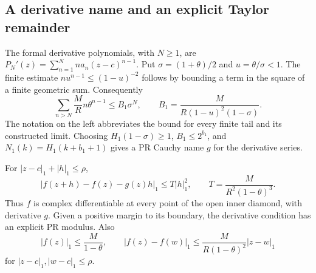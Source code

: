 \subsection{A derivative name and an explicit Taylor remainder}

The formal derivative polynomials, with \(N\geq1\), are
\(P_N'(z)=\sum_{n=1}^N n a_n(z-c)^{n-1}\). Put
\(\sigma=(1+\theta)/2\) and \(u=\theta/\sigma<1\). The finite estimate
\(n u^{n-1}\leq(1-u)^{-2}\) follows by bounding a term in the square of a finite geometric sum. Consequently
\begin{equation}
 \sum_{n>N}\frac{M}{R}n\theta^{n-1}
 \leq B_1\sigma^N,
 \qquad B_1=\frac{M}{R(1-u)^2(1-\sigma)}.
 \label{eq:derivative-tail}
\end{equation}
The notation on the left abbreviates the bound for every finite tail and its constructed limit. Choosing \(H_1(1-\sigma)\geq1\), \(B_1\leq2^{b_1}\), and \(N_1(k)=H_1(k+b_1+1)\) gives a PR Cauchy name \(g\) for the derivative series.

\begin{theorem}\label{thm:complex-derivative}
For \(|z-c|_1+|h|_1\leq\rho\),
\begin{equation}
 |f(z+h)-f(z)-g(z)h|_1
 \leq T|h|_1^2,
 \qquad T=\frac{M}{R^2(1-\theta)^3}.
 \label{eq:complex-remainder}
\end{equation}
Thus \(f\) is complex differentiable at every point of the open inner diamond, with derivative \(g\). Given a positive margin to its boundary, the derivative condition has an explicit PR modulus. Also
\begin{equation}
 |f(z)|_1\leq\frac{M}{1-\theta},\qquad
 |f(z)-f(w)|_1\leq\frac{M}{R(1-\theta)^2}|z-w|_1
 \label{eq:complex-lip}
\end{equation}
for \(|z-c|_1,|w-c|_1\leq\rho\).
\end{theorem}

